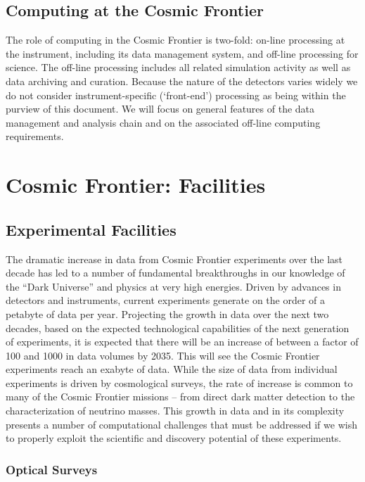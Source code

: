 \subsection{Computing at the Cosmic Frontier}

The role of computing in the Cosmic Frontier is two-fold: on-line
processing at the instrument, including its data management system,
and off-line processing for science. The off-line processing includes
all related simulation activity as well as data archiving and
curation. Because the nature of the detectors varies widely we do not
consider instrument-specific (`front-end') processing as being within
the purview of this document. We will focus on general features of the
data management and analysis chain and on the associated off-line
computing requirements.

\section{Cosmic Frontier: Facilities}

\subsection{Experimental Facilities}

The dramatic increase in data from Cosmic Frontier experiments over
the last decade has led to a number of fundamental breakthroughs in
our knowledge of the ``Dark Universe'' and physics at very high
energies. Driven by advances in detectors and instruments, current
experiments generate on the order of a petabyte of data per
year. Projecting the growth in data over the next two decades, based
on the expected technological capabilities of the next generation of
experiments, it is expected that there will be an increase of between
a factor of 100 and 1000 in data volumes by 2035. This will see the
Cosmic Frontier experiments reach an exabyte of data. While the size
of data from individual experiments is driven by cosmological surveys,
the rate of increase is common to many of the Cosmic Frontier missions
-- from direct dark matter detection to the characterization of
neutrino masses. This growth in data and in its complexity presents a
number of computational challenges that must be addressed if we wish
to properly exploit the scientific and discovery potential of these
experiments.

\subsubsection{Optical Surveys}

